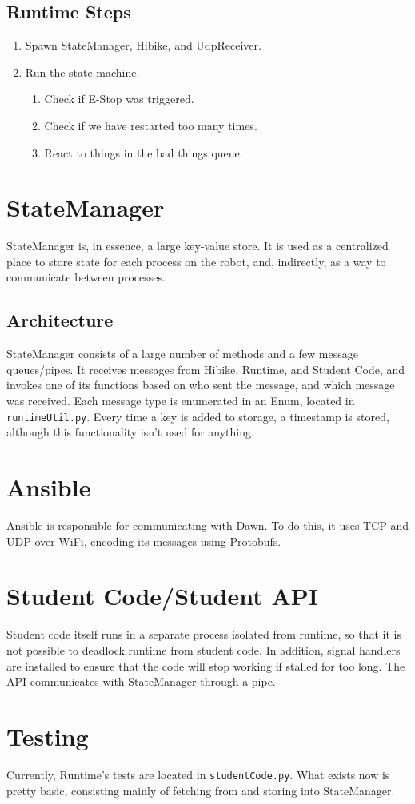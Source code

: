 \documentclass[12pt]{book}
\begin{document}
\subsection{Runtime Steps}
\begin{enumerate}
    \item Spawn StateManager, Hibike, and UdpReceiver.
    \item Run the state machine.
        \begin{enumerate}
            \item Check if E-Stop was triggered.
            \item Check if we have restarted too many times.
            \item React to things in the bad things queue.
        \end{enumerate}
\end{enumerate}
\section{StateManager}
StateManager is, in essence, a large key-value store. It is used as
a centralized place to store state for each process on the robot,
and, indirectly, as a way to communicate between processes.

\subsection{Architecture}
StateManager consists of a large number of methods and a few message queues/pipes.
It receives messages from Hibike, Runtime, and Student Code, and invokes
one of its functions based on who sent the message, and which message
was received. Each message type is enumerated in an Enum, located in
\texttt{runtimeUtil.py}. Every time a key is added to storage,
a timestamp is stored, although this functionality isn't used for anything.

\section{Ansible}
Ansible is responsible for communicating with Dawn. To do this, it uses
TCP and UDP over WiFi, encoding its messages using Protobufs.
\section{Student Code/Student API}
Student code itself runs in a separate process isolated from runtime, so that
it is not possible to deadlock runtime from student code. In addition,
signal handlers are installed to ensure that the code will stop
working if stalled for too long. The API communicates with StateManager
through a pipe.

\section{Testing}
Currently, Runtime's tests are located in \texttt{studentCode.py}. What
exists now is pretty basic, consisting mainly of fetching from and
storing into StateManager.
\end{document}

